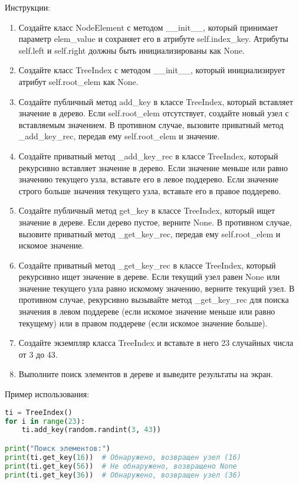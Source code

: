 \begin{enumerate}
Инструкции:
\begin{enumerate}
    \item Создайте класс NodeElement с методом \_\_init\_\_, который принимает параметр elem\_value и сохраняет его в атрибуте self.index\_key. Атрибуты self.left и self.right должны быть инициализированы как None.
    \item Создайте класс TreeIndex с методом \_\_init\_\_, который инициализирует атрибут self.root\_elem как None.
    \item Создайте публичный метод add\_key в классе TreeIndex, который вставляет значение в дерево. Если self.root\_elem отсутствует, создайте новый узел с вставляемым значением. В противном случае, вызовите приватный метод \_add\_key\_rec, передав ему self.root\_elem и значение.
    \item Создайте приватный метод \_add\_key\_rec в классе TreeIndex, который рекурсивно вставляет значение в дерево. Если значение меньше или равно значению текущего узла, вставьте его в левое поддерево. Если значение строго больше значения текущего узла, вставьте его в правое поддерево.
    \item Создайте публичный метод get\_key в классе TreeIndex, который ищет значение в дереве. Если дерево пустое, верните None. В противном случае, вызовите приватный метод \_get\_key\_rec, передав ему self.root\_elem и искомое значение.
    \item Создайте приватный метод \_get\_key\_rec в классе TreeIndex, который рекурсивно ищет значение в дереве. Если текущий узел равен None или значение текущего узла равно искомому значению, верните текущий узел. В противном случае, рекурсивно вызывайте метод \_get\_key\_rec для поиска значения в левом поддереве (если искомое значение меньше или равно текущему) или в правом поддереве (если искомое значение больше).
    \item Создайте экземпляр класса TreeIndex и вставьте в него 23 случайных числа от 3 до 43.
    \item Выполните поиск элементов в дереве и выведите результаты на экран.
\end{enumerate}

Пример использования:
\begin{lstlisting}[language=Python]
ti = TreeIndex()
for i in range(23):
    ti.add_key(random.randint(3, 43))

print("Поиск элементов:")
print(ti.get_key(16))  # Обнаружено, возвращен узел (16)
print(ti.get_key(56))  # Не обнаружено, возвращено None
print(ti.get_key(36))  # Обнаружено, возвращен узел (36)
\end{lstlisting}


\end{enumerate}
